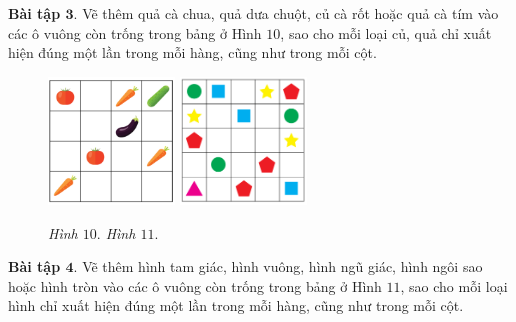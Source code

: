 	\vskip 0.1cm
	\textbf{Bài tập $\pmb{3.}$} Vẽ thêm quả cà chua, quả dưa chuột, củ cà rốt hoặc quả cà tím vào các ô vuông còn trống trong bảng ở Hình $10$, sao cho mỗi loại củ, quả chỉ xuất hiện đúng một lần trong mỗi hàng, cũng như trong mỗi cột.
		\begin{figure}[H]
		\vspace*{-5pt}
		\centering
		\captionsetup{labelformat=empty, justification=centering}
		\includegraphics[width=0.3\textwidth]{hinh11}\hspace{40pt}
		\includegraphics[width=0.3\textwidth]{hinh13}
		
		\caption{\textit{\small Hình $10.$ \hspace*{75pt} Hình $11.$ }}  %
		\vspace*{-10pt}
	\end{figure}
	\textbf{Bài tập $\pmb{4.}$} Vẽ thêm  hình tam giác, hình vuông,  hình ngũ giác, hình ngôi sao hoặc hình tròn vào các ô vuông còn trống trong bảng ở Hình $11$, sao cho mỗi loại hình chỉ xuất hiện đúng một lần trong mỗi hàng, cũng như trong mỗi cột.